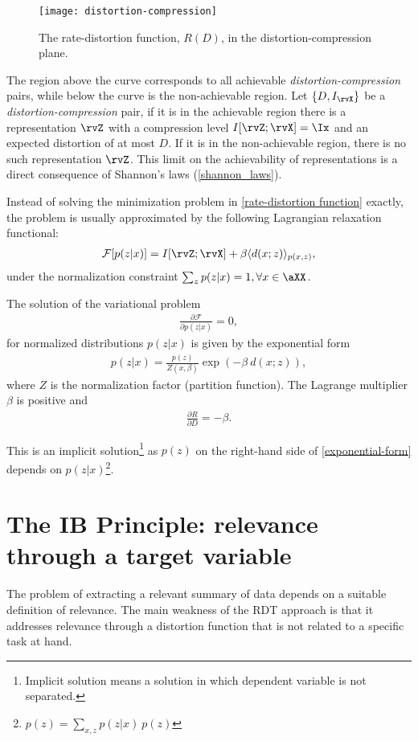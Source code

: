 	\begin{figure}
		[htb] \centering
		\texttt{[image: distortion-compression]}
		\caption{The rate-distortion function, $R(D)$, in the distortion-compression plane.}
	\label{fig:distortion-compression-plane}
	\end{figure}
The region above the curve corresponds to all achievable \emph{distortion-compression} pairs, while below the curve is the non-achievable region. Let $\{D, I_{\rvX}\}$ be a \emph{distortion-compression} pair, if it is in the achievable region there is a representation $\rvZ$ with a compression level $I[\rvZ;\rvX]=\Ix$ and an expected distortion of at most $D$. If it is in the non-achievable region, there is no such representation $\rvZ$. This limit on the achievability of representations is a direct consequence of Shannon's laws (\ref{shannon_laws}).

Instead of solving the minimization problem in \eqref{rate-distortion function} exactly, the problem is usually approximated by the following Lagrangian relaxation functional:
\begin{align}
	\mathcal{F}[p(z|x)] = I[\rvZ;\rvX] + \beta \langle d(x;z) \rangle_{p(x,z)},
\end{align}
under the normalization constraint $\sum_z p(z|x)=1, \forall x \in \aXX$.

\begin{theorem}\label{thrm:RDT solution}
	The solution of the variational problem~\cite{tishby:1999}
	\begin{align}
		\frac{\partial \mathcal{F}}{\partial p(z|x)}=0,
	\end{align}
	for normalized distributions $p(z|x)$ is given by the exponential form
	\begin{align}
		p(z|x) = \frac{p(z)}{Z(x,\beta)}\exp (-\beta ~d(x;z)),\label{exponential-form}
	\end{align}
	where $Z$ is the normalization factor (partition function).  The Lagrange multiplier $\beta$ is positive and
	\begin{align}
		\frac{\partial R}{\partial D} = - \beta.
	\end{align}
\end{theorem}
This is an implicit solution\footnote{Implicit solution means a solution in which dependent variable is not separated.} as $p(z)$ on the right-hand side of \eqref{exponential-form} depends on $p(z|x)$\footnote{$p(z)=\sum_{x,z} p(z|x)~p(z)$}.

\section{The IB Principle: relevance through a target variable}\label{sec:IB_principle}
The problem of extracting a relevant summary of data depends on a suitable definition of relevance. The main weakness of the \ac{RDT} approach is that it addresses relevance through a distortion function that is not related to a specific task at hand.

